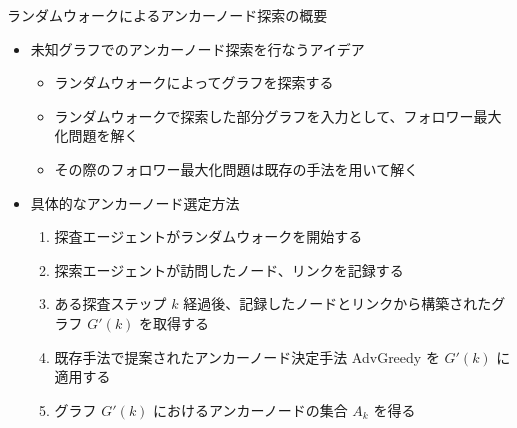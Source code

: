 \documentclass[compress,dvipdfmx,11pt]{beamer}
\begin{document}
\begin{frame}[label={sec:org27a6bc8}]{ランダムウォークによるアンカーノード探索の概要}
\begin{itemize}
\item 未知グラフでのアンカーノード探索を行なうアイデア
\begin{itemize}
\item ランダムウォークによってグラフを探索する
\item ランダムウォークで探索した部分グラフを入力として、フォロワー最大化問題を解く
\item その際のフォロワー最大化問題は既存の手法を用いて解く
\end{itemize}
\item 具体的なアンカーノード選定方法
\begin{enumerate}
\item 探査エージェントがランダムウォークを開始する
\item 探索エージェントが訪問したノード、リンクを記録する
\item ある探査ステップ \(k\) 経過後、記録したノードとリンクから構築されたグラフ \(G'(k)\) を取得する
\item 既存手法で提案されたアンカーノード決定手法 AdvGreedy を \(G'(k)\) に適用する
\item グラフ \(G'(k)\) におけるアンカーノードの集合 \(A_k\) を得る
\end{enumerate}
\end{itemize}
\end{frame}
\end{document}
